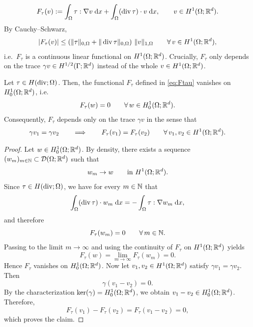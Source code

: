 \begin{equation}\label{eq:Ftau}
	F_\tau(v):= \int_\Omega \tau : \nabla v\;\dx +\int_\Omega (\diver\tau)\cdot v\;\dx,\qquad v\in H^1(\Omega;\R^d).
\end{equation}
By Cauchy--Schwarz,
\begin{equation*}
	|F_\tau(v)|
	\le
	\left(\|\tau\|_{0,\Omega}+\|\diver\tau\|_{0,\Omega}\right)\,\|v\|_{1,\Omega}
	\qquad\forall\,v\in H^1(\Omega;\R^d),
\end{equation*}
i.e.\ $F_\tau$ is a continuous linear functional on $H^1(\Omega;{\mathbb R}^d)$. Crucially, $F_\tau$ only depends on the trace $\gamma v\in H^{1/2}(\Gamma;{\mathbb R}^d)$ instead of the whole $v\in H^1(\Omega;{\mathbb R}^d)$.
\begin{proposition}\label{pr:Ftau_depends_on_trace}
	Let $\tau\in H(\diver;\Omega)$. Then, the functional $F_\tau$ defined in \eqref{eq:Ftau} vanishes on $H^1_0(\Omega;{\mathbb R}^d)$, i.e.
	\begin{equation*}
		F_\tau(w)=0
		\qquad\forall\,w\in H^1_0(\Omega;{\mathbb R}^d).
	\end{equation*}
	Consequently, $F_\tau$ depends only on the trace $\gamma v$ in the sense that
	\begin{equation*}
		\gamma v_1=\gamma v_2
		\qquad\Longrightarrow\qquad
		F_\tau(v_1)=F_\tau(v_2)
		\qquad\forall\,v_1,v_2\in H^1(\Omega;{\mathbb R}^d).
	\end{equation*}
\end{proposition}
\begin{proof}
	Let $w\in H^1_0(\Omega;{\mathbb R}^d)$. By density, there exists a sequence $(w_m)_{m\in{\mathbb N}}\subset {\mathcal D}(\Omega;{\mathbb R}^d)$ such that
	\begin{equation*}
		w_m\to w
		\qquad\text{in }H^1(\Omega;{\mathbb R}^d).
	\end{equation*}
	Since $\tau\in H(\diver;\Omega)$, we have for every $m\in{\mathbb N}$ that
	\begin{equation*}
		\int_\Omega (\diver\tau)\cdot w_m\;\dx
		=
		-\int_\Omega \tau:\nabla w_m\;\dx,
	\end{equation*}
	and therefore
	\begin{equation*}
		F_\tau(w_m)=0
		\qquad\forall\,m\in{\mathbb N}.
	\end{equation*}
	Passing to the limit $m\to\infty$ and using the continuity of $F_\tau$ on $H^1(\Omega;{\mathbb R}^d)$ yields
	\begin{equation*}
		F_\tau(w)=\lim_{m\to\infty}F_\tau(w_m)=0.
	\end{equation*}
	Hence $F_\tau$ vanishes on $H^1_0(\Omega;{\mathbb R}^d)$. Now let $v_1,v_2\in H^1(\Omega;{\mathbb R}^d)$ satisfy $\gamma v_1=\gamma v_2$. Then
	\begin{equation*}
		\gamma(v_1-v_2)=0.
	\end{equation*}
	By the characterization $\ker(\gamma)=H^1_0(\Omega;{\mathbb R}^d)$, we obtain $v_1-v_2\in H^1_0(\Omega;{\mathbb R}^d)$. Therefore,
	\begin{equation*}
		F_\tau(v_1)-F_\tau(v_2)
		=
		F_\tau(v_1-v_2)
		=
		0,
	\end{equation*}
	which proves the claim.
\end{proof}
